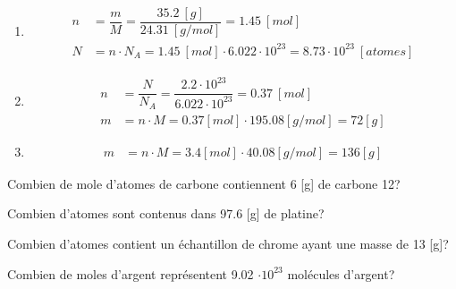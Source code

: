 \documentclass[
  11pt,
  french,
  a4paper,
  openany]{book}
\begin{document}
\begin{Answer}

\begin{enumerate}
\def\labelenumi{\arabic{enumi}.}
\item
  \[ \begin{split}
       n &= \dfrac{m}{M} = \dfrac{35.2~[g]}{24.31~[g/mol]} = 1.45~[mol] \\
       N &= n \cdot N_{A} = 1.45~[mol] \cdot 6.022\cdot10^{23} = 8.73\cdot10^{23}~[atomes]
       \end{split} \]
\item
  \[ \begin{split}
       n &= \dfrac{N}{N_{A}} = \dfrac{2.2\cdot10^{23}}{6.022\cdot10^{23}} = 0.37~[mol] \\
       m &= n \cdot M = 0.37[mol] \cdot 195.08[g/mol] = 72[g]
       \end{split} \]
\item
  \[ \begin{split}
       m &= n \cdot M = 3.4[mol] \cdot 40.08[g/mol] = 136[g]
       \end{split} \]
\end{enumerate}


\end{Answer}

\begin{Exercise}

Combien de mole d'atomes de carbone contiennent 6 {[}g{]} de carbone 12?


Combien d'atomes sont contenus dans 97.6 {[}g{]} de platine?


Combien d'atomes contient un échantillon de chrome ayant une masse de 13 {[}g{]}?


Combien de moles d'argent représentent 9.02 \(\cdot 10^{23}\) molécules d'argent?



\end{Exercise}
\end{document}
